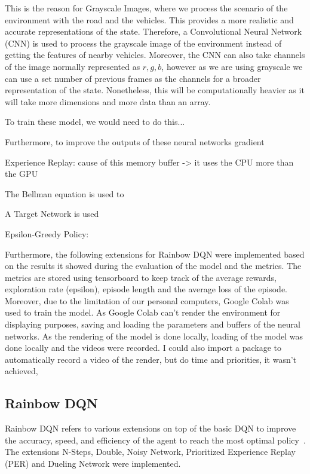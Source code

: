 \documentclass{article}
\begin{document}
This is the reason for Grayscale Images, where we process the scenario of the environment with the road and the vehicles.
This provides a more realistic and accurate representations of the state.
Therefore, a Convolutional Neural Network (CNN) is used to process the grayscale image of the environment instead of getting the features of nearby vehicles.
Moreover, the CNN can also take channels of the image normally represented as \(r,g,b\), however as we are using grayscale we can use a set number of previous frames as the channels for a broader representation of the state.
Nonetheless, this will be computationally heavier as it will take more dimensions and more data than an array.

To train these model, we would need to do this...

Furthermore, to improve the outputs of these neural networks gradient 

Experience Replay:
cause of this memory buffer -> it uses the CPU more than the GPU

The Bellman equation is used to 

A Target Network is used 

Epsilon-Greedy Policy:


Furthermore, the following extensions for Rainbow DQN were implemented based on the results it showed during the evaluation of the model and the metrics.
The metrics are stored using tensorboard to keep track of the average rewards, exploration rate (epsilon), episode length and the average loss of the episode.
Moreover, due to the limitation of our personal computers, Google Colab was used to train the model.
As Google Colab can't render the environment for displaying purposes, saving and loading the parameters and buffers of the neural networks.
As the rendering of the model is done locally, loading of the model was done locally and the videos were recorded.
I could also import a package to automatically record a video of the render, but do time and priorities, it wasn't achieved,

\subsection{Rainbow DQN}
Rainbow DQN refers to various extensions on top of the basic DQN to improve the accuracy, speed,  and efficiency of the agent to reach the most optimal policy~\cite{hessel_rainbow_2017}.
The extensions N-Steps, Double, Noisy Network, Prioritized Experience Replay (PER) and Dueling Network were implemented.
\end{document}
